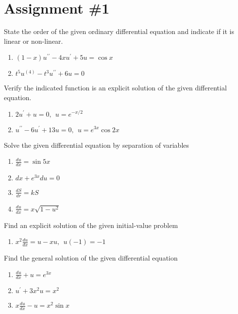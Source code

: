\chapter{Assignment \#1}
\label{ch:ass1}
\begin{fullwidth}

State the order of the given ordinary differential equation and indicate if it is linear or non-linear.

\begin{enumerate}
\item $\left(1-x\right)u^{\prime \prime}-4xu^{\prime} + 5u = \cos{x}$
\vspace{1.0cm}
\item $t^5u^{(4)}-t^3u^{\prime \prime}+6u=0$
\vspace{1.0cm}
\end{enumerate}

\noindent Verify the indicated function is an explicit solution of the given differential equation.
\begin{enumerate}[resume]
\item $2u^{\prime}+u=0, \ \ u=e^{-x/2}$
\vspace{1.0cm}
\item $u^{\prime \prime} - 6u^{\prime}+13u=0, \ \ u=e^{3x}\cos{2x}$
\vspace{1.0cm}
\end{enumerate}

\noindent Solve the given differential equation by separation of variables
\begin{enumerate}[resume]
\item $\frac{du}{dx}=\sin{5x}$
\vspace{1.0cm}
\item $dx + e^{3x}du = 0$
\vspace{1.0cm}
\item $\frac{dS}{dr} = kS$
\vspace{1.0cm}
\item $\frac{du}{dx} = x\sqrt{1-u^2}$
\vspace{1.0cm}
\end{enumerate}

\noindent Find an explicit solution of the given initial-value problem
\begin{enumerate}[resume]
\item $x^2 \frac{du}{dx}=u-xu, \ \ u(-1)=-1$
\vspace{1.0cm}
\end{enumerate}

\noindent Find the general solution of the given differential equation
\begin{enumerate}[resume]
\item $\frac{du}{dx} + u = e^{3x}$
\vspace{1.0cm}
\item $u^{\prime} + 3x^2u = x^2$
\vspace{1.0cm}
\item $x\frac{du}{dx}-u=x^2\sin{x}$
\end{enumerate}

\end{fullwidth}
